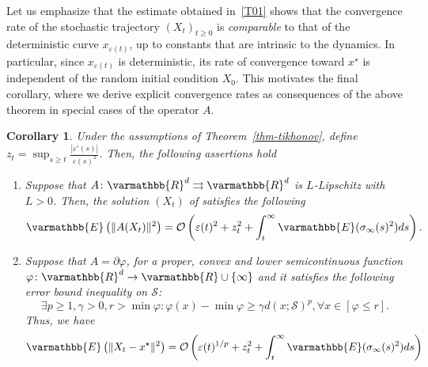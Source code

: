\documentclass[11pt,reqno]{article}
\let\mathbb=\varmathbb
\newcommand{\R}{\mathbb{R}}
\newcommand{\tto}{\rightrightarrows}
\renewcommand{\epsilon}{\varepsilon}
\newcommand{\1}{\mathds{1}}
\numberwithin{equation}{section}  %
\theoremstyle{plain}
\newtheorem{corollary}[theorem]{Corollary}
\theoremstyle{definition}
\theoremstyle{remark}
\numberwithin{theorem}{section}
\numberwithin{remark}{section}
\numberwithin{example}{section}
\begin{document}
Let us emphasize that the estimate obtained in~\eqref{T01} shows that the convergence rate of the stochastic trajectory $(X_t)_{t\geq 0}$ is \emph{comparable} to that of the deterministic curve $x_{\epsilon(t)}$, up to constants that are intrinsic to the dynamics.
In particular, since $x_{\epsilon(t)}$ is deterministic, its rate of convergence toward $x^\star$ is independent of the random initial condition $X_0$.
This motivates the final corollary, where we derive explicit convergence rates as consequences of the above theorem in special cases of the operator $A$.

\begin{corollary}
Under the assumptions of  Theorem~\ref{thm-tikhonov},    define $z_t = \sup_{s\geq t}\frac{|\epsilon'(s)|}{\epsilon(s)^2}$.   Then, the following assertions hold
    \begin{enumerate}[label = (\alph*)]
        \item Suppose that $A\colon \R^d\tto \R^d$ is $L$-Lipschitz with $L>0$. Then, the solution $(X_t)$ of  satisfies the following
    \begin{equation}\label{rate-tikhonov1}
        \mathbb{E}\left(\|A(X_t)\|^2\right) = \mathcal{O}\left( \epsilon(t)^2  +  z_t^2  + \int_t^\infty\mathbb{E}(\sigma_\infty(s)^2)ds\right).
    \end{equation}
    \item Suppose that $A = \partial\varphi$, for a proper, convex and lower semicontinuous function  $\varphi\colon \R^d \to \R\cup\{ \infty\}$ and it satisfies the following error bound inequality on $\mathcal{S}$:
    \begin{equation*}
        \exists p\geq 1, \gamma>0, r>\min \varphi : \varphi(x)-\min \varphi\geq \gamma d(x;\mathcal{S})^p, \forall x\in [\varphi\leq r].
    \end{equation*}
    Thus,   we have
    \begin{equation}\label{rate-tikhonov2}
        \mathbb{E}\left(\|X_t-x^\star\|^2\right) = \mathcal{O}\left( \epsilon(t)^{1/p}  +  z_t^2  + \int_t^\infty\mathbb{E}(\sigma_\infty(s)^2)ds\right)
    \end{equation}
    \end{enumerate}
    
\end{corollary}
\end{document}
